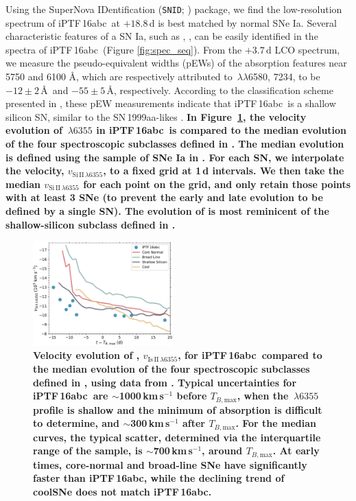 \documentclass[twocolumn]{aastex61}
\newcommand{\abc}{iPTF\,16abc}
\begin{document}
Using the SuperNova IDentification (\texttt{SNID};
\citealt{2007ApJ...666.1024B}) package, we find the low-resolution spectrum of
\abc\ at $+18.8$\,d is best matched by normal SNe Ia. Several characteristic
features of a SN Ia, such as , , can be easily identified
in the spectra of \abc\ (Figure \ref{fig:spec_seq}). From the $+3.7 \,
\mathrm{d}$ LCO spectrum, we measure the pseudo-equivalent widths (pEWs) of
the absorption features near 5750 and 6100 \AA, which are respectively
attributed to \,$\lambda\lambda$6580, 7234, to be $-12 \pm 2$\,\AA\
and $-55 \pm 5$\,\AA, respectively. According to the classification scheme
presented in \citet{2006PASP..118..560B}, these pEW measurements indicate that
\abc\ is a shallow silicon SN, similar to the SN\,1999aa-likes
\citep{2009PASP..121..238B}. \textbf{In Figure~\ref{fig:branch_vel}, the
velocity evolution of \ion{Si}{2}$\,\lambda6355$ in \abc\ is compared to the
median evolution of the four spectroscopic subclasses defined in
\citet{2006PASP..118..560B}. The median evolution is defined using the sample
of SNe Ia in \citet{2012AJ....143..126B}. For each SN, we interpolate the
\ion{Si}{2} velocity, $v_{\mathrm{Si\,II}\,\lambda6355}$, to a fixed grid at
1\,d intervals. We then take the median $v_{\mathrm{Si\,II}\,\lambda6355}$ for
each point on the grid, and only retain those points with at least 3 SNe (to
prevent the early and late evolution to be defined by a single SN). The
evolution of \ion{Si}{2} is most reminicent of the shallow-silicon subclass
defined in \citet{2006PASP..118..560B}. }

\begin{figure}[htb]
  \centering
  \includegraphics[width=0.48\textwidth]{Branch_vel_evol.pdf}
  \caption{\textbf{Velocity evolution of ,   
           $v_{\mathrm{Is\,II}\,\lambda6355}$, for \abc\ compared to the median
           evolution of the four spectroscopic subclasses defined in
           \citet{2006PASP..118..560B}, using data from
           \citet{2012AJ....143..126B}. Typical uncertainties for \abc\ are
           $\sim$1000\,km\,s$^{-1}$ before $T_{B,\mathrm{max}}$, when the
           \ion{Si}{2}$\,\lambda6355$ profile is shallow and the minimum of
           absorption is difficult to determine, and $\sim$300\,km\,s$^{-1}$
           after $T_{B,\mathrm{max}}$. For the median curves, the typical
           scatter, determined via the interquartile range of the sample, is
           $\sim$700\,km\,s$^{-1}$, around $T_{B,\mathrm{max}}$.
           At early times, core-normal and broad-line SNe have significantly
           faster \ion{Si}{2} than \abc, while the declining trend of coolSNe
           does not match \abc.}
  }
  \label{fig:branch_vel}
\end{figure}
\end{document}
